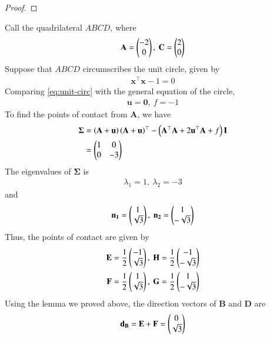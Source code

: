 \documentclass[journal,12pt,twocolumn]{IEEEtran}
\renewcommand{\vec}[1]{\boldsymbol{\mathbf{#1}}}
\begin{document}
\begin{enumerate}
\begin{proof}
    \end{proof}
    Call the quadrilateral $ABCD$, where
    \begin{align}
        \vec{A} = \myvec{-2\\0},\ \vec{C} = \myvec{2\\0}
        \label{eq:a-c-def}
    \end{align}
    Suppose that $ABCD$ circumscribes the unit circle, given by
    \begin{align}
        \vec{x}^\top\vec{x} - 1 = 0
        \label{eq:unit-circ}
    \end{align}
    Comparing \eqref{eq:unit-circ} with the general equation of the circle,
    \begin{align}
        \vec{u} = \vec{0},\ f = -1
        \label{eq:u-f-val}
    \end{align}
    To find the points of contact from $\vec{A}$, we have
    \begin{align}
        \vec{\Sigma} &= \brak{\vec{A}+\vec{u}}\brak{\vec{A}+\vec{u}}^\top - \brak{\vec{A}^\top\vec{A}+2\vec{u}^\top\vec{A} + f}\vec{I} \\
                     &= \myvec{1&0\\0&-3}
                     \label{eq:sigma}
    \end{align}
    The eigenvalues of $\vec{\Sigma}$ is
    \begin{align}
        \lambda_1 = 1,\ \lambda_2 = -3
        \label{eq:lambda}
    \end{align}
    and
    \begin{align}
        \vec{n_1} = \myvec{1\\\sqrt{3}},\ \vec{n_2} = \myvec{1\\-\sqrt{3}}
        \label{eq:n-sigma}
    \end{align}
    Thus, the points of contact are given by
    \begin{align}
        \vec{E} = \frac{1}{2}\myvec{-1\\\sqrt{3}},\ \vec{H} = \frac{1}{2}\myvec{-1\\-\sqrt{3}} \\
        \vec{F} = \frac{1}{2}\myvec{1\\\sqrt{3}},\ \vec{G} = \frac{1}{2}\myvec{1\\-\sqrt{3}}
        \label{eq:poc}
    \end{align}
    Using the lemma we proved above, the direction vectors of $\vec{B}$ and 
    $\vec{D}$ are
    \begin{align}
        \vec{d_B} &= \vec{E} + \vec{F} = \myvec{0\\\sqrt{3}} \label{eq:d-B} \\

\end{align}
\end{enumerate}
\end{document}
